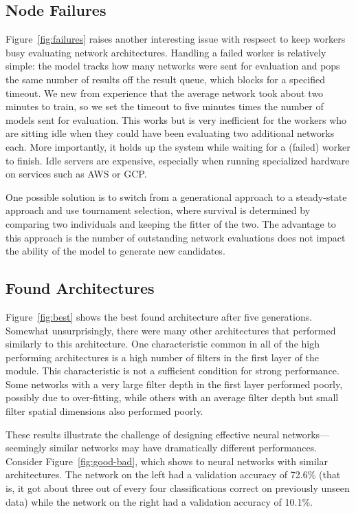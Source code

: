 \documentclass[conference]{IEEEtran}
\begin{document}
\subsection{Node Failures}
Figure~\ref{fig:failures} raises another interesting issue with respsect
to keep workers busy evaluating network architectures. Handling a failed
worker is relatively simple: the model tracks how many networks were
sent for evaluation and pops the same number of results off the result
queue, which blocks for a specified timeout. We new from experience that the
average network took about two minutes to train, so we set the timeout to
five minutes times the number of models sent for evaluation. This works
but is very inefficient for the workers who are sitting idle when
they could have been evaluating two additional networks each. More importantly,
it holds up the system while waiting for a (failed) worker to finish.
Idle servers
are expensive, especially when running specialized hardware on services
such as AWS or GCP.

One possible solution is to switch from a generational approach to a steady-state
approach and use tournament selection, where survival is determined by comparing
two individuals and keeping the fitter of the two. The advantage to this approach
is the number of outstanding network evaluations does not impact the ability of
the model to generate new candidates.

\subsection{Found Architectures}
Figure~\ref{fig:best} shows the best found architecture after five generations.
Somewhat unsurprisingly, there were many other architectures that performed
similarly to this architecture. One characteristic common in all of the high
performing architectures is a high number of filters in the first layer of
the module. This characteristic is not a sufficient condition for strong
performance. Some networks with a very large filter depth in the first layer
performed poorly, possibly due to over-fitting, while others with an average
filter depth but small filter spatial dimensions also performed poorly.

These results illustrate the challenge of designing effective neural
networks---seemingly similar networks may have dramatically different
performances. Consider Figure~\ref{fig:good-bad}, which shows to neural
networks with similar architectures. The network on the left had a validation
accuracy of 72.6\% (that is, it got about three out of every four classifications
correct on previously unseen data) while the network on the right had a
validation accuracy of 10.1\%.
\end{document}
